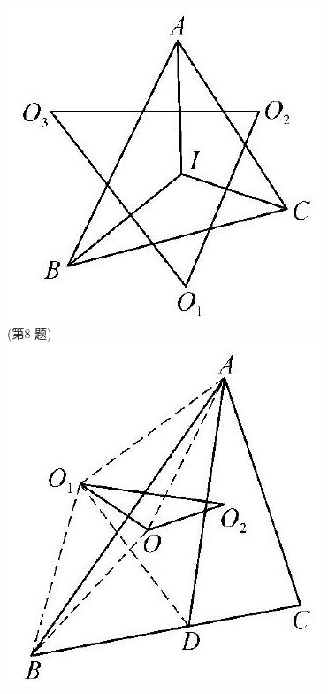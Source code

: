 \documentclass[10pt]{article}
\begin{document}
\includegraphics[max width=\textwidth, center]{2024_10_30_66b8e5e701da2093c133g-106(1)}\\
(第8 题)\\
\includegraphics[max width=\textwidth, center]{2024_10_30_66b8e5e701da2093c133g-106(2)}\\
\end{document}
